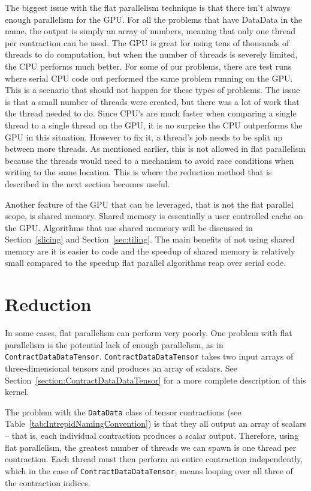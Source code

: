 The biggest issue with the flat parallelism technique is that there isn't always enough parallelism for the GPU. For all the problems that have DataData in the name, the output is simply an array of numbers, meaning that only one thread per contraction can be used. The GPU is great for using tens of thousands of threads to do computation, but when the number of threads is severely limited, the CPU performs much better. For some of our problems, there are test runs where serial CPU code out performed the same problem running on the GPU. This is a scenario that should not happen for these types of problems. The issue is that a small number of threads were created, but there was a lot of work that the thread needed to do. Since CPU's are much faster when comparing a single thread to a single thread on the GPU, it is no surprise the CPU outperforms the GPU in this situation. However to fix it, a thread's job needs to be split up between more threads. As mentioned earlier, this is not allowed in flat parallelism because the threads would need to a mechanism to avoid race conditions when writing to the same location. This is where the reduction method that is described in the next section becomes useful.

Another feature of the GPU that can be leveraged, that is not the flat parallel scope, is shared memory. Shared memory is essentially a user controlled cache on the GPU. Algorithms that use shared memeory will be discussed in Section~\ref{slicing} and Section~\ref{sec:tiling}. The main benefits of not using shared memory are it is easier to code and the speedup of shared memory is relatively small compared to the speedup flat parallel algorithms reap over serial code. 

\section{Reduction} \label{sec:reduction}
In some cases, flat parallelism can perform very poorly.  One problem with flat
parallelism is the potential lack of enough parallelism, as in
\texttt{ContractDataDataTensor}.  \texttt{ContractDataDataTensor} takes two
input arrays of three-dimensional tensors and produces an array of scalars.  See
Section~\ref{section:ContractDataDataTensor} for a more complete description of
this kernel.

The problem with the \texttt{DataData} class of tensor contractions (see
Table~\ref{tab:IntrepidNamingConvention}) is that they all output an array of
scalars -- that is, each individual contraction produces a scalar output.
Therefore, using flat parallelism, the greatest number of threads we can spawn
is one thread per contraction.  Each thread must then perform an entire
contraction independently, which in the case of \texttt{ContractDataDataTensor},
means looping over all three of the contraction indices.

